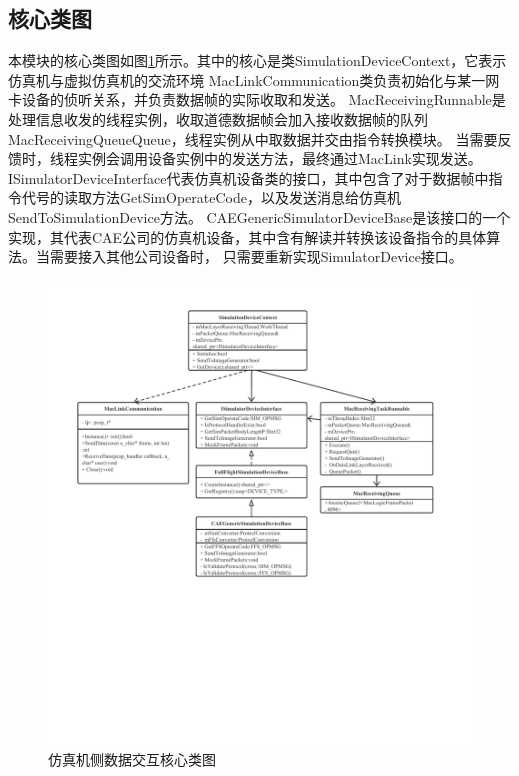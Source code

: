 \subsection{核心类图}
\par
本模块的核心类图如图\ref{module12}所示。其中的核心是类SimulationDeviceContext，它表示仿真机与虚拟仿真机的交流环境
MacLinkCommunication类负责初始化与某一网卡设备的侦听关系，并负责数据帧的实际收取和发送。
MacReceivingRunnable是处理信息收发的线程实例，收取道德数据帧会加入接收数据帧的队列MacReceivingQueueQueue，线程实例从中取数据并交由指令转换模块。
当需要反馈时，线程实例会调用设备实例中的发送方法，最终通过MacLink实现发送。
ISimulatorDeviceInterface代表仿真机设备类的接口，其中包含了对于数据帧中指令代号的读取方法GetSimOperateCode，以及发送消息给仿真机SendToSimulationDevice方法。
CAEGenericSimulatorDeviceBase是该接口的一个实现，其代表CAE公司的仿真机设备，其中含有解读并转换该设备指令的具体算法。当需要接入其他公司设备时，
只需要重新实现SimulatorDevice接口。
\clearpage
\begin{figure}[h!]
    \begin{center}
        \includegraphics[width=\textwidth]{pictures/classdiagram1.pdf}
        \caption{仿真机侧数据交互核心类图}
        \label{module12}
    \end{center}
\end{figure}

